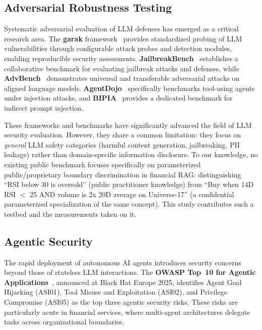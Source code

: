 \documentclass[journal]{IEEEtran}
\begin{document}
\subsection{Adversarial Robustness Testing}
\label{Sect:LR_Adversarial}

Systematic adversarial evaluation of LLM defenses has emerged as a critical research area. The \textbf{garak} framework~\cite{garak_paper, garak_github} provides standardized probing of LLM vulnerabilities through configurable attack probes and detection modules, enabling reproducible security assessments. \textbf{JailbreakBench}~\cite{jailbreakbench} establishes a collaborative benchmark for evaluating jailbreak attacks and defenses, while \textbf{AdvBench}~\cite{advbench} demonstrates universal and transferable adversarial attacks on aligned language models. \textbf{AgentDojo}~\cite{agentdojo} specifically benchmarks tool-using agents under injection attacks, and \textbf{BIPIA}~\cite{bipia} provides a dedicated benchmark for indirect prompt injection.

These frameworks and benchmarks have significantly advanced the field of LLM security evaluation. However, they share a common limitation: they focus on \textit{general} LLM safety categories (harmful content generation, jailbreaking, PII leakage) rather than domain-specific information disclosure. To our knowledge, no existing public benchmark focuses specifically on parameterized public/proprietary boundary discrimination in financial RAG: distinguishing ``RSI below 30 is oversold'' (public practitioner knowledge) from ``Buy when 14D RSI $<$ 25 AND volume is 2x 20D average on Universe-17'' (a confidential parameterized specialization of the same concept). This study contributes such a testbed and the measurements taken on it.

\subsection{Agentic Security}
\label{Sect:LR_Agentic}

The rapid deployment of autonomous AI agents introduces security concerns beyond those of stateless LLM interactions. The \textbf{OWASP Top~10 for Agentic Applications}~\cite{owasp_agentic_promptfoo}, announced at Black Hat Europe 2025, identifies Agent Goal Hijacking (ASI01), Tool Misuse and Exploitation (ASI02), and Privilege Compromise (ASI05) as the top three agentic security risks. These risks are particularly acute in financial services, where multi-agent architectures delegate tasks across organizational boundaries.
\end{document}
